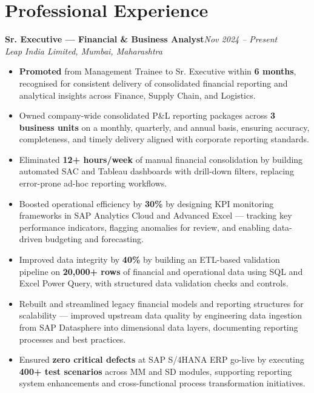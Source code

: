 \documentclass[10pt, letterpaper]{article}
\newcommand{\role}[3]{%
  \vspace{2pt}%
  {\bfseries #1}\hfill{\small\color{muted}\textit{#3}}\\[-2pt]%
  {\small\color{muted}\textit{#2}}%
}
\begin{document}
\section{Professional Experience}

\role{Sr. Executive — Financial \& Business Analyst}{Leap India Limited, Mumbai, Maharashtra}{Nov 2024 – Present}

\begin{itemize}
  \item \textbf{Promoted} from Management Trainee to Sr. Executive within \textbf{6 months}, recognised for consistent delivery of consolidated financial reporting and analytical insights across Finance, Supply Chain, and Logistics.
  \item Owned company-wide consolidated P\&L reporting packages across \textbf{3 business units} on a monthly, quarterly, and annual basis, ensuring accuracy, completeness, and timely delivery aligned with corporate reporting standards.
  \item Eliminated \textbf{12+ hours/week} of manual financial consolidation by building automated SAC and Tableau dashboards with drill-down filters, replacing error-prone ad-hoc reporting workflows.
  \item Boosted operational efficiency by \textbf{30\%} by designing KPI monitoring frameworks in SAP Analytics Cloud and Advanced Excel — tracking key performance indicators, flagging anomalies for review, and enabling data-driven budgeting and forecasting.
  \item Improved data integrity by \textbf{40\%} by building an ETL-based validation pipeline on \textbf{20,000+ rows} of financial and operational data using SQL and Excel Power Query, with structured data validation checks and controls.
  \item Rebuilt and streamlined legacy financial models and reporting structures for scalability — improved upstream data quality by engineering data ingestion from SAP Datasphere into dimensional data layers, documenting reporting processes and best practices.
  \item Ensured \textbf{zero critical defects} at SAP S/4HANA ERP go-live by executing \textbf{400+ test scenarios} across MM and SD modules, supporting reporting system enhancements and cross-functional process transformation initiatives.
\end{itemize}

\vspace{1pt}
\end{document}
